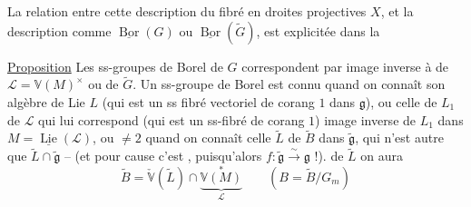 La relation  entre cette description du fibré en droites projectives $X$, et la description comme $\underline{\operatorname{Bor}}(G)$ ou $\underline{\operatorname{Bor}}(\widetilde G)$, est explicitée dans la

\uline{Proposition} Les ss-groupes de Borel  de $G$ correspondent  par image inverse à   de $\mathcal L=\mathbb V(M)^\times$ ou  de $\widetilde G$. Un ss-groupe de Borel est connu quand on connaît son algèbre de Lie $L$ (qui est un ss fibré vectoriel de corang $1$ dans $\mathfrak g$), ou celle de $L_1$ de $\mathcal L$ qui lui correspond (qui est un ss-fibré   de corang $1$) image inverse de $L_1$ dans $M=\underline{\operatorname{Lie}}(\mathcal L)$,  ou  $\ne2$ quand on connaît celle $\widetilde L$ de $\widetilde B$ dans $\widetilde{\mathfrak g}$, qui n'est autre que $\widetilde L\cap\widetilde{\mathfrak g}$ -- (et pour cause c'est , puisqu'alors $f:\widetilde{\mathfrak g}\xrightarrow{\sim}\mathfrak g$ !).    de $\widetilde L$ on aura
\[
\widetilde B=\check{\mathbb V}(\widetilde L)\cap\underbrace{\mathbb V(M)}_{\mathcal L}^{*}\qquad(B=\widetilde B/G_m)\tag*{(57)}
\]
